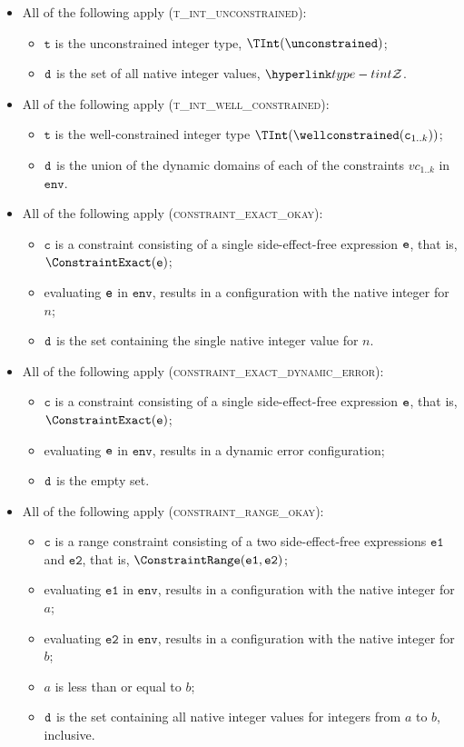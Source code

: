 \documentclass{book}
\newcommand\env[0]{\texttt{env}}
\newcommand\vc[0]{\texttt{c}}
\newcommand\vt[0]{\texttt{t}}
\newcommand\veone[0]{\texttt{e1}}
\newcommand\vetwo[0]{\texttt{e2}}
\begin{document}
\begin{itemize}
  \item All of the following apply (\textsc{t\_int\_unconstrained}):
  \begin{itemize}
    \item $\vt$ is the unconstrained integer type, $\TInt(\unconstrained)$;
    \item $\texttt{d}$ is the set of all native integer values, $\tint$.
  \end{itemize}

  \item All of the following apply (\textsc{t\_int\_well\_constrained}):
  \begin{itemize}
    \item $\vt$ is the well-constrained integer type $\TInt(\wellconstrained(\vc_{1..k}))$;
    \item $\texttt{d}$ is the union of the dynamic domains of each of the constraints $vc_{1..k}$ in $\env$.
  \end{itemize}

  \item All of the following apply (\textsc{constraint\_exact\_okay}):
  \begin{itemize}
    \item $\vc$ is a constraint consisting of a single side-effect-free expression $\texttt{e}$, that is, $\ConstraintExact(\ve)$;
    \item evaluating $\texttt{e}$ in $\env$, results in a configuration with the native integer for $n$;
    \item $\texttt{d}$ is the set containing the single native integer value for $n$.
  \end{itemize}

  \item All of the following apply (\textsc{constraint\_exact\_dynamic\_error}):
  \begin{itemize}
    \item $\vc$ is a constraint consisting of a single side-effect-free expression $\texttt{e}$, that is, $\ConstraintExact(\ve)$;
    \item evaluating $\texttt{e}$ in $\env$, results in a dynamic error configuration;
    \item $\texttt{d}$ is the empty set.
  \end{itemize}

  \item All of the following apply (\textsc{constraint\_range\_okay}):
  \begin{itemize}
    \item $\vc$ is a range constraint consisting of a two side-effect-free expressions $\veone$ and $\vetwo$, that is, $\ConstraintRange(\veone, \vetwo)$;
    \item evaluating $\veone$ in $\env$, results in a configuration with the native integer for $a$;
    \item evaluating $\vetwo$ in $\env$, results in a configuration with the native integer for $b$;
    \item $a$ is less than or equal to $b$;
    \item $\texttt{d}$ is the set containing all native integer values for integers from $a$ to $b$, inclusive.
  \end{itemize}


\end{itemize}
\end{document}
